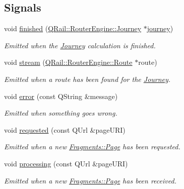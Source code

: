 \subsection*{Signals}
\begin{DoxyCompactItemize}
\item 
void \mbox{\hyperlink{classQRail_1_1RouterEngine_1_1Planner_ada19d57ce540325d6de9c29521ca6dfd}{finished}} (\mbox{\hyperlink{classQRail_1_1RouterEngine_1_1Journey}{Q\+Rail\+::\+Router\+Engine\+::\+Journey}} $\ast$\mbox{\hyperlink{classQRail_1_1RouterEngine_1_1Planner_af3ae9c83f09d8dadabe6d0e24b22401e}{journey}})
\begin{DoxyCompactList}\small\item\em Emitted when the \mbox{\hyperlink{classQRail_1_1RouterEngine_1_1Journey}{Journey}} calculation is finished. \end{DoxyCompactList}\item 
void \mbox{\hyperlink{classQRail_1_1RouterEngine_1_1Planner_a0221f287017cfb3a24826d1ce349120c}{stream}} (\mbox{\hyperlink{classQRail_1_1RouterEngine_1_1Route}{Q\+Rail\+::\+Router\+Engine\+::\+Route}} $\ast$route)
\begin{DoxyCompactList}\small\item\em Emitted when a route has been found for the \mbox{\hyperlink{classQRail_1_1RouterEngine_1_1Journey}{Journey}}. \end{DoxyCompactList}\item 
void \mbox{\hyperlink{classQRail_1_1RouterEngine_1_1Planner_af6fce3843991fb2ab155fba9bfd3e6b4}{error}} (const Q\+String \&message)
\begin{DoxyCompactList}\small\item\em Emitted when something goes wrong. \end{DoxyCompactList}\item 
void \mbox{\hyperlink{classQRail_1_1RouterEngine_1_1Planner_a048be5d38aa731894e585aa4ceb4bc68}{requested}} (const Q\+Url \&page\+U\+RI)
\begin{DoxyCompactList}\small\item\em Emitted when a new \mbox{\hyperlink{classQRail_1_1Fragments_1_1Page}{Fragments\+::\+Page}} has been requested. \end{DoxyCompactList}\item 
void \mbox{\hyperlink{classQRail_1_1RouterEngine_1_1Planner_a2ea8cbe8a514124729079cd793ff8454}{processing}} (const Q\+Url \&page\+U\+RI)
\begin{DoxyCompactList}\small\item\em Emitted when a new \mbox{\hyperlink{classQRail_1_1Fragments_1_1Page}{Fragments\+::\+Page}} has been received. \end{DoxyCompactList}\end{DoxyCompactItemize}
